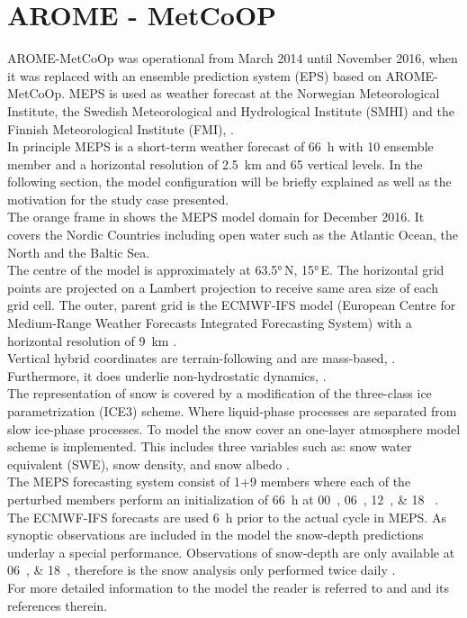 \section{AROME - MetCoOP}
\label{sec:MEPS}
AROME-MetCoOp was operational from March 2014 until November 2016, when it was replaced with an ensemble prediction system (EPS) based on AROME-MetCoOp.
MEPS is used as weather forecast at the Norwegian Meteorological Institute, the Swedish Meteorological and Hydrological Institute (SMHI) and the Finnish Meteorological Institute (FMI), \citep{muller_arome-metcoop:_2017, koltzow_metcoop_2017}. 
\\
In principle MEPS is a short-term weather forecast of \SI{66}{\hour} with 10 ensemble member and a horizontal resolution of \SI{2.5}{\km} and 65 vertical levels. In the following section, the model configuration will be briefly explained as well as the motivation for the study case presented.
\\
The orange frame in  shows the MEPS model domain for December 2016. It covers the Nordic Countries including open water such as the Atlantic Ocean, the North and the Baltic Sea.  
\\
The centre of the model is approximately at \ang{63.5}\,N, \ang{15}\,E. 
The horizontal grid points are projected on a Lambert projection to receive same area size of each grid cell. 
The outer, parent grid is the ECMWF-IFS model (European Centre for Medium-Range Weather Forecasts Integrated Forecasting System) with a horizontal resolution of \SI{9}{\km} \citep{homleid_verification_2016}. 
\\
Vertical hybrid coordinates are terrain-following and are mass-based, \citep{muller_arome-metcoop:_2017}. Furthermore, it does underlie non-hydrostatic dynamics, \citep{wiki_description_2017}.
\\
The representation of snow is covered by a modification of the three-class ice parametrization (ICE3) scheme. Where liquid-phase processes are separated from slow ice-phase processes. To model the snow cover an one-layer atmosphere model scheme is implemented. This includes three variables such as: snow water equivalent (SWE), snow density, and snow albedo \citep{muller_arome-metcoop:_2017}.
\\
The MEPS forecasting system consist of 1+9 members where each of the perturbed members perform an initialization of \SI{66}{\hour} at \SIlist{00;06;12;18}{\UTC} \citep{wiki_description_2017}. The ECMWF-IFS forecasts are used \SI{6}{\hour} prior to the actual cycle in MEPS. As synoptic observations are included in the model the snow-depth predictions underlay a special performance. Observations of snow-depth are only available at \SIlist{06;18}{\UTC}, therefore is the snow analysis only performed twice daily \citep{muller_arome-metcoop:_2017, homleid_verification_2016}. 
\\
For more detailed information to the model the reader is referred to \cite{muller_arome-metcoop:_2017} and \cite{wiki_description_2017} and its references therein.

